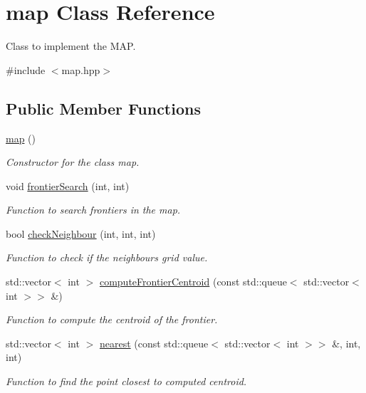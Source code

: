 \hypertarget{classmap}{}\section{map Class Reference}
\label{classmap}


Class to implement the M\+AP.  




{\ttfamily \#include $<$map.\+hpp$>$}

\subsection*{Public Member Functions}
\begin{DoxyCompactItemize}
\item 
\hyperlink{classmap_abedfe6722ad83929739afd899c88fea4}{map} ()
\begin{DoxyCompactList}\small\item\em Constructor for the class map. \end{DoxyCompactList}\item 
void \hyperlink{classmap_acaa7a0726870c1d08c75b3f84caa298b}{frontier\+Search} (int, int)
\begin{DoxyCompactList}\small\item\em Function to search frontiers in the map. \end{DoxyCompactList}\item 
bool \hyperlink{classmap_a5e55d5c21318b0036147b9ea558c6983}{check\+Neighbour} (int, int, int)
\begin{DoxyCompactList}\small\item\em Function to check if the neighbour\textquotesingle{}s grid value. \end{DoxyCompactList}\item 
std\+::vector$<$ int $>$ \hyperlink{classmap_ad07d469282f85b48d181e530a886b335}{compute\+Frontier\+Centroid} (const std\+::queue$<$ std\+::vector$<$ int $>$$>$ \&)
\begin{DoxyCompactList}\small\item\em Function to compute the centroid of the frontier. \end{DoxyCompactList}\item 
std\+::vector$<$ int $>$ \hyperlink{classmap_a300d8aaac77b805595e640205aad1cb0}{nearest} (const std\+::queue$<$ std\+::vector$<$ int $>$$>$ \&, int, int)
\begin{DoxyCompactList}\small\item\em Function to find the point closest to computed centroid. \end{DoxyCompactList}\item 

\end{DoxyCompactItemize}
